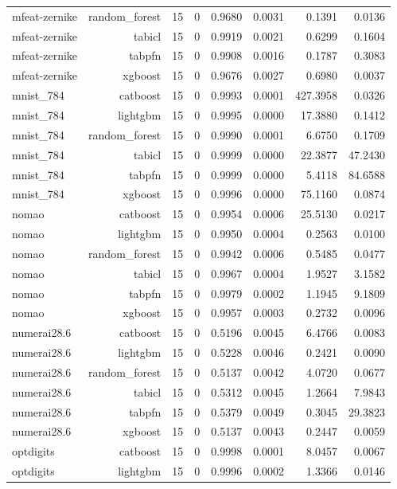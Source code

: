 \begin{table}[htbp]
\begin{tabular}{lrrrrrrr}
mfeat-zernike & random\_forest & 15 & 0 & 0.9680 & 0.0031 & 0.1391 & 0.0136 \\
mfeat-zernike & tabicl & 15 & 0 & 0.9919 & 0.0021 & 0.6299 & 0.1604 \\
mfeat-zernike & tabpfn & 15 & 0 & 0.9908 & 0.0016 & 0.1787 & 0.3083 \\
mfeat-zernike & xgboost & 15 & 0 & 0.9676 & 0.0027 & 0.6980 & 0.0037 \\
mnist\_784 & catboost & 15 & 0 & 0.9993 & 0.0001 & 427.3958 & 0.0326 \\
mnist\_784 & lightgbm & 15 & 0 & 0.9995 & 0.0000 & 17.3880 & 0.1412 \\
mnist\_784 & random\_forest & 15 & 0 & 0.9990 & 0.0001 & 6.6750 & 0.1709 \\
mnist\_784 & tabicl & 15 & 0 & 0.9999 & 0.0000 & 22.3877 & 47.2430 \\
mnist\_784 & tabpfn & 15 & 0 & 0.9999 & 0.0000 & 5.4118 & 84.6588 \\
mnist\_784 & xgboost & 15 & 0 & 0.9996 & 0.0000 & 75.1160 & 0.0874 \\
nomao & catboost & 15 & 0 & 0.9954 & 0.0006 & 25.5130 & 0.0217 \\
nomao & lightgbm & 15 & 0 & 0.9950 & 0.0004 & 0.2563 & 0.0100 \\
nomao & random\_forest & 15 & 0 & 0.9942 & 0.0006 & 0.5485 & 0.0477 \\
nomao & tabicl & 15 & 0 & 0.9967 & 0.0004 & 1.9527 & 3.1582 \\
nomao & tabpfn & 15 & 0 & 0.9979 & 0.0002 & 1.1945 & 9.1809 \\
nomao & xgboost & 15 & 0 & 0.9957 & 0.0003 & 0.2732 & 0.0096 \\
numerai28.6 & catboost & 15 & 0 & 0.5196 & 0.0045 & 6.4766 & 0.0083 \\
numerai28.6 & lightgbm & 15 & 0 & 0.5228 & 0.0046 & 0.2421 & 0.0090 \\
numerai28.6 & random\_forest & 15 & 0 & 0.5137 & 0.0042 & 4.0720 & 0.0677 \\
numerai28.6 & tabicl & 15 & 0 & 0.5312 & 0.0045 & 1.2664 & 7.9843 \\
numerai28.6 & tabpfn & 15 & 0 & 0.5379 & 0.0049 & 0.3045 & 29.3823 \\
numerai28.6 & xgboost & 15 & 0 & 0.5137 & 0.0043 & 0.2447 & 0.0059 \\
optdigits & catboost & 15 & 0 & 0.9998 & 0.0001 & 8.0457 & 0.0067 \\
optdigits & lightgbm & 15 & 0 & 0.9996 & 0.0002 & 1.3366 & 0.0146 \\

\end{tabular}
\end{table}
